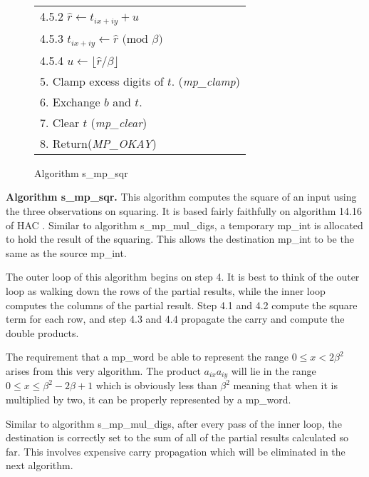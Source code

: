 \documentclass[b5paper]{book}
\begin{document}
\begin{figure}[!here]
\begin{small}
\begin{center}
\begin{tabular}{l}
\hspace{6mm}4.5.2  $\hat r \leftarrow t_{ix + iy} + u$ \\
\hspace{6mm}4.5.3  $t_{ix + iy} \leftarrow \hat r \mbox{ (mod }\beta\mbox{)}$ \\
\hspace{6mm}4.5.4  $u \leftarrow \lfloor \hat r / \beta \rfloor$ \\
5.  Clamp excess digits of $t$.  (\textit{mp\_clamp}) \\
6.  Exchange $b$ and $t$. \\
7.  Clear $t$ (\textit{mp\_clear}) \\
8.  Return(\textit{MP\_OKAY}) \\
\hline
\end{tabular}
\end{center}
\end{small}
\caption{Algorithm s\_mp\_sqr}
\end{figure}

\textbf{Algorithm s\_mp\_sqr.}
This algorithm computes the square of an input using the three observations on squaring.  It is based fairly faithfully on  algorithm 14.16 of HAC
\cite[pp.596-597]{HAC}.  Similar to algorithm s\_mp\_mul\_digs, a temporary mp\_int is allocated to hold the result of the squaring.  This allows the 
destination mp\_int to be the same as the source mp\_int.

The outer loop of this algorithm begins on step 4. It is best to think of the outer loop as walking down the rows of the partial results, while
the inner loop computes the columns of the partial result.  Step 4.1 and 4.2 compute the square term for each row, and step 4.3 and 4.4 propagate
the carry and compute the double products.  

The requirement that a mp\_word be able to represent the range $0 \le x < 2 \beta^2$ arises from this
very algorithm.  The product $a_{ix}a_{iy}$ will lie in the range $0 \le x \le \beta^2 - 2\beta + 1$ which is obviously less than $\beta^2$ meaning that
when it is multiplied by two, it can be properly represented by a mp\_word.

Similar to algorithm s\_mp\_mul\_digs, after every pass of the inner loop, the destination is correctly set to the sum of all of the partial 
results calculated so far.  This involves expensive carry propagation which will be eliminated in the next algorithm.  
\end{document}
